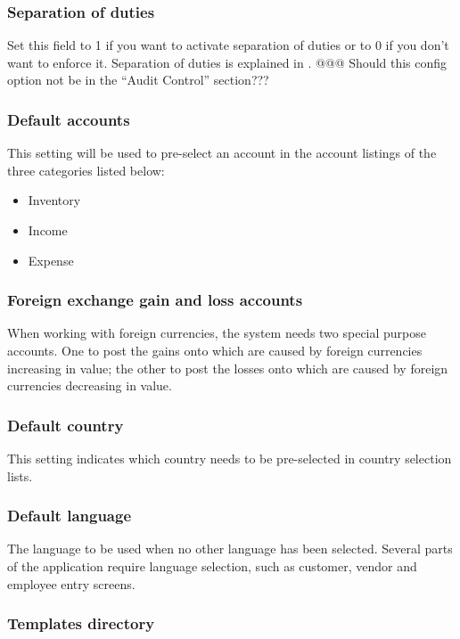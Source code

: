 \subsubsection{Separation of duties}
   Set this field to 1 if you want to activate separation of duties or to 0 if you don't
   want to enforce it. Separation of duties is explained in . @@@ Should this config option not be in the ``Audit Control'' section???

\subsubsection{Default accounts}

 This setting will be used to pre-select an account in
the account listings of the three categories listed below:
\begin{itemize}
\item Inventory
\item Income
\item Expense
\end{itemize}


\subsubsection{Foreign exchange gain and loss accounts}

When working with foreign currencies,
the system needs two special purpose accounts. One to post the gains onto which are
caused by foreign currencies increasing in value; the other to post the losses onto
which are caused by foreign currencies decreasing in value.


\subsubsection{Default country}

This setting indicates which country needs to be pre-selected
   in country selection lists.


\subsubsection{Default language}

The language to be used when no other language has been selected. Several parts of the
application require language selection, such as customer, vendor and employee entry screens.

\subsubsection{Templates directory}

